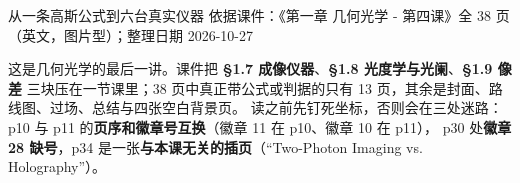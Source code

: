 ﻿\documentclass[11pt]{ctexart}
\begin{document}
{从一条高斯公式到六台真实仪器}
{依据课件：《第一章 几何光学 - 第四课》全 38 页（英文，图片型）；整理日期 2026-10-27}

\vspace{-4pt}


这是几何光学的最后一讲。课件把 \textbf{§1.7 成像仪器}、\textbf{§1.8 光度学与光阑}、\textbf{§1.9 像差}
三块压在一节课里；38 页中真正带公式或判据的只有 13 页，其余是封面、路线图、过场、总结与四张空白背景页。
读之前先钉死坐标，否则会在三处迷路：p10 与 p11 的\textbf{页序和徽章号互换}（徽章 11 在 p10、徽章 10 在 p11），
p30 处\textbf{徽章 28 缺号}，p34 是一张\textbf{与本课无关的插页}（“Two-Photon Imaging vs. Holography”）。

\end{document}
